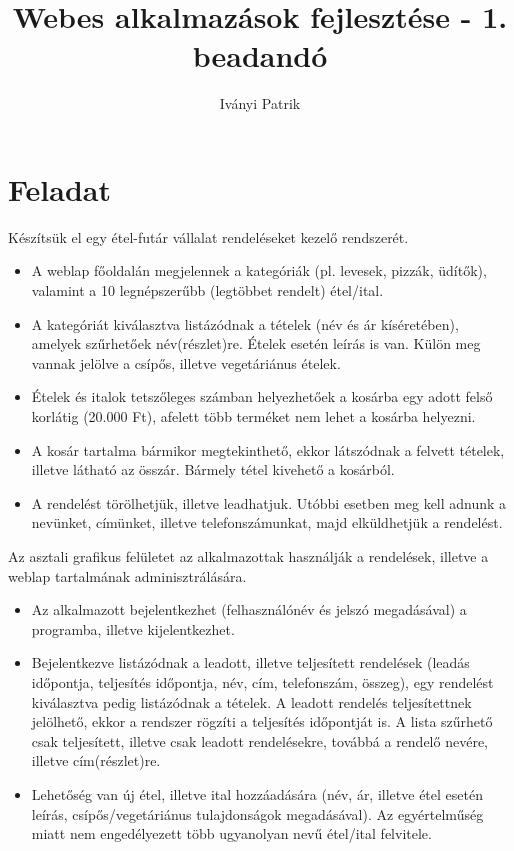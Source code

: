 \documentclass[12pt,a4paper]{article}
\author{Iványi Patrik}
\title{Webes alkalmazások fejlesztése - 1. beadandó}
\begin{document}
\maketitle

\section{Feladat}
Készítsük el egy étel-futár vállalat rendeléseket kezelő rendszerét.
\begin{itemize}
\item A weblap főoldalán megjelennek a kategóriák (pl. levesek, pizzák, üdítők),
 valamint a 10 legnépszerűbb (legtöbbet rendelt) étel/ital.
\item A kategóriát kiválasztva listázódnak a tételek (név és ár kíséretében), amelyek szűrhetőek név(részlet)re. Ételek esetén leírás is van. Külön meg vannak jelölve a csípős, illetve vegetáriánus ételek.
\item Ételek és italok tetszőleges számban helyezhetőek a kosárba egy adott felső korlátig (20.000 Ft),  afelett több terméket nem lehet a kosárba helyezni. 
\item A  kosár  tartalma  bármikor  megtekinthető,  ekkor  látszódnak  a felvett tételek, illetve látható az összár. Bármely tétel kivehető a kosárból.
\item A  rendelést törölhetjük,  illetve leadhatjuk.  Utóbbi  esetben meg   kell adnunk a nevünket, címünket, illetve telefonszámunkat, majd elküldhetjük a rendelést.
\end{itemize}

Az asztali grafikus felületet az alkalmazottak használják a rendelések, illetve a weblap tartalmának adminisztrálására.
\begin{itemize}
\item Az alkalmazott bejelentkezhet (felhasználónév és jelszó megadásával) a programba, illetve kijelentkezhet.
\item Bejelentkezve listázódnak a leadott, illetve teljesített rendelések (leadás időpontja, teljesítés időpontja, név, cím, telefonszám, összeg), egy rendelést kiválasztva pedig listázódnak a tételek. A leadott rendelés teljesítettnek jelölhető, ekkor a rendszer rögzíti a teljesítés időpontját is. A lista szűrhető csak teljesített, illetve csak leadott rendelésekre, továbbá a rendelő nevére, illetve cím(részlet)re.
\item Lehetőség van új étel, illetve ital hozzáadására (név, ár, illetve étel esetén leírás, csípős/vegetáriánus tulajdonságok megadásával). Az egyértelműség miatt nem engedélyezett több ugyanolyan nevű étel/ital felvitele.

\end{itemize}
\end{document}
